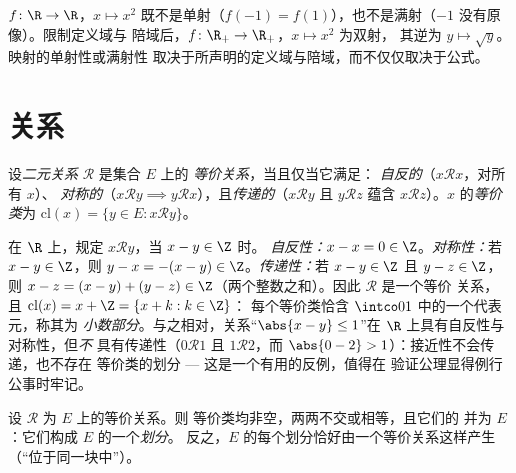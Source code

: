 \begin{example}\label{ex:b1:logic:injexamples}
$f \colon \R \to \R$，$x \mapsto x^2$ 既不是单射（$f(-1) =
f(1)$），也不是满射（$-1$ 没有原像）。限制定义域与
陪域后，$f \colon \R_+ \to \R_+$，$x \mapsto x^2$ 为双射，
其逆为 $y \mapsto \sqrt y$。映射的单射性或满射性
取决于所声明的定义域与陪域，而不仅仅取决于公式。
\end{example}

\section{关系}

\begin{definition}[等价关系]\label{def:b1:logic:equiv}
设\emph{二元关系} $\mathcal{R}$ 是集合 $E$ 上的
\emph{等价关系}，当且仅当它满足：
\emph{自反的}（$x \mathbin{\mathcal{R}} x$，对所有 $x$）、
\emph{对称的}（$x \mathbin{\mathcal{R}} y \implies y
\mathbin{\mathcal{R}} x$），且\emph{传递的}（$x
\mathbin{\mathcal{R}} y$ 且 $y \mathbin{\mathcal{R}} z$ 蕴含 $x
\mathbin{\mathcal{R}} z$）。$x$ 的\emph{等价类}为
$\mathrm{cl}(x) = \{y \in E : x \mathbin{\mathcal{R}} y\}$。
\end{definition}

\begin{example}[检验三条公理]\label{ex:b1:logic:fracpart}
在 $\R$ 上，规定 $x \mathbin{\mathcal{R}} y$，当 $x - y \in \Z$ 时。
\emph{自反性：}$x - x = 0 \in \Z$。\emph{对称性：}若 $x - y
\in \Z$，则 $y - x = -(x - y) \in \Z$。\emph{传递性：}若 $x -
y \in \Z$ 且 $y - z \in \Z$，则 $x - z = (x - y) + (y - z) \in
\Z$（两个整数之和）。因此 $\mathcal R$ 是一个等价
关系，且 $\mathrm{cl}(x) = x + \Z = \{x + k : k \in \Z\}$：
每个等价类恰含 $\intco01$ 中的一个代表元，称其为
\emph{小数部分}。与之相对，关系“$\abs{x - y}
\leq 1$”在 $\R$ 上具有自反性与对称性，但\emph{不}
具有传递性（$0 \mathbin{\mathcal R} 1$ 且 $1 \mathbin{\mathcal R}
2$，而 $\abs{0 - 2} > 1$）：接近性不会传递，也不存在
等价类的划分 --- 这是一个有用的反例，值得在
验证公理显得例行公事时牢记。
\end{example}

\begin{theorem}[等价类构成划分]\label{thm:b1:logic:partition}
设 $\mathcal{R}$ 为 $E$ 上的等价关系。则
等价类均非空，两两不交或相等，且它们的
并为 $E$：它们构成 $E$ 的一个\emph{划分}。
反之，$E$ 的每个划分恰好由一个等价关系这样产生
（“位于同一块中”）。
\end{theorem}


